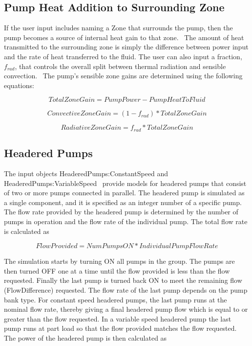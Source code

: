 \subsection{Pump Heat Addition to Surrounding Zone}\label{pump-heat-addition-to-surrounding-zone}

If the user input includes naming a Zone that surrounds the pump, then the pump becomes a source of internal heat gain to that zone.~ The amount of heat transmitted to the surrounding zone is simply the difference between power input and the rate of heat transferred to the fluid. The user can also input a fraction, \({f_{rad}}\), that controls the overall split between thermal radiation and sensible convection.~ The pump's sensible zone gains are determined using the following equations:

\begin{equation}
TotalZoneGain = PumpPower - PumpHeatToFluid
\end{equation}

\begin{equation}
ConvectiveZoneGain = \left( {1 - {f_{rad}}} \right)*TotalZoneGain
\end{equation}

\begin{equation}
RadiativeZoneGain = {f_{rad}}*TotalZoneGain
\end{equation}

\subsection{Headered Pumps}\label{headered-pumps}

The input objects HeaderedPumps:ConstantSpeed and HeaderedPumps:VariableSpeed ~provide models for headered pumps that consist of two or more pumps connected in parallel. The headered pump is simulated as a single component, and it is specified as an integer number of a specific pump. The flow rate provided by the headered pump is determined by the number of pumps in operation and the flow rate of the individual pump. The total flow rate is calculated as

\begin{equation}
FlowProvided = NumPumpsON*IndividualPumpFlowRate
\end{equation}

The simulation starts by turning ON all pumps in the group. The pumps are then turned OFF one at a time until the flow provided is less than the flow requested. Finally the last pump is turned back ON to meet the remaining flow (FlowDifference) requested. The flow rate of the last pump depends on the pump bank type. For constant speed headered pumps, the last pump runs at the nominal flow rate, thereby giving a final headered pump flow which is equal to or greater than the flow requested. In a variable speed headered pump the last pump runs at part load so that the flow provided matches the flow requested. The power of the headered pump is then calculated as

